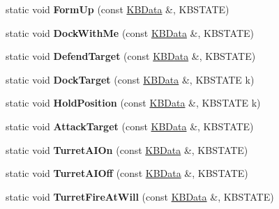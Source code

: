 \begin{DoxyCompactItemize}
\item 
static void {\bfseries Form\+Up} (const \hyperlink{classKBData}{K\+B\+Data} \&, K\+B\+S\+T\+A\+TE)\hypertarget{classFireKeyboard_a57045776afc9e70fe78ed0ebceab0665}{}\label{classFireKeyboard_a57045776afc9e70fe78ed0ebceab0665}

\item 
static void {\bfseries Dock\+With\+Me} (const \hyperlink{classKBData}{K\+B\+Data} \&, K\+B\+S\+T\+A\+TE)\hypertarget{classFireKeyboard_a7ff7b6429113684c091b319ed53f5cc6}{}\label{classFireKeyboard_a7ff7b6429113684c091b319ed53f5cc6}

\item 
static void {\bfseries Defend\+Target} (const \hyperlink{classKBData}{K\+B\+Data} \&, K\+B\+S\+T\+A\+TE)\hypertarget{classFireKeyboard_a022ea5ca6719ce0c9bf645fa6f64f2f2}{}\label{classFireKeyboard_a022ea5ca6719ce0c9bf645fa6f64f2f2}

\item 
static void {\bfseries Dock\+Target} (const \hyperlink{classKBData}{K\+B\+Data} \&, K\+B\+S\+T\+A\+TE k)\hypertarget{classFireKeyboard_a9322071129fa78935af8869111c92105}{}\label{classFireKeyboard_a9322071129fa78935af8869111c92105}

\item 
static void {\bfseries Hold\+Position} (const \hyperlink{classKBData}{K\+B\+Data} \&, K\+B\+S\+T\+A\+TE k)\hypertarget{classFireKeyboard_ad61700102c1316d092ebe5623d710e0f}{}\label{classFireKeyboard_ad61700102c1316d092ebe5623d710e0f}

\item 
static void {\bfseries Attack\+Target} (const \hyperlink{classKBData}{K\+B\+Data} \&, K\+B\+S\+T\+A\+TE)\hypertarget{classFireKeyboard_acd0b2d622082942709eb15d915e9a03d}{}\label{classFireKeyboard_acd0b2d622082942709eb15d915e9a03d}

\item 
static void {\bfseries Turret\+A\+I\+On} (const \hyperlink{classKBData}{K\+B\+Data} \&, K\+B\+S\+T\+A\+TE)\hypertarget{classFireKeyboard_a1b0bcc108a756a129a25f22c757fbfa5}{}\label{classFireKeyboard_a1b0bcc108a756a129a25f22c757fbfa5}

\item 
static void {\bfseries Turret\+A\+I\+Off} (const \hyperlink{classKBData}{K\+B\+Data} \&, K\+B\+S\+T\+A\+TE)\hypertarget{classFireKeyboard_a57c31a2be56ee298de0565a14e420221}{}\label{classFireKeyboard_a57c31a2be56ee298de0565a14e420221}

\item 
static void {\bfseries Turret\+Fire\+At\+Will} (const \hyperlink{classKBData}{K\+B\+Data} \&, K\+B\+S\+T\+A\+TE)\hypertarget{classFireKeyboard_a175a94a07e4b9ed32e40dc9932eedd9f}{}\label{classFireKeyboard_a175a94a07e4b9ed32e40dc9932eedd9f}


\end{DoxyCompactItemize}

